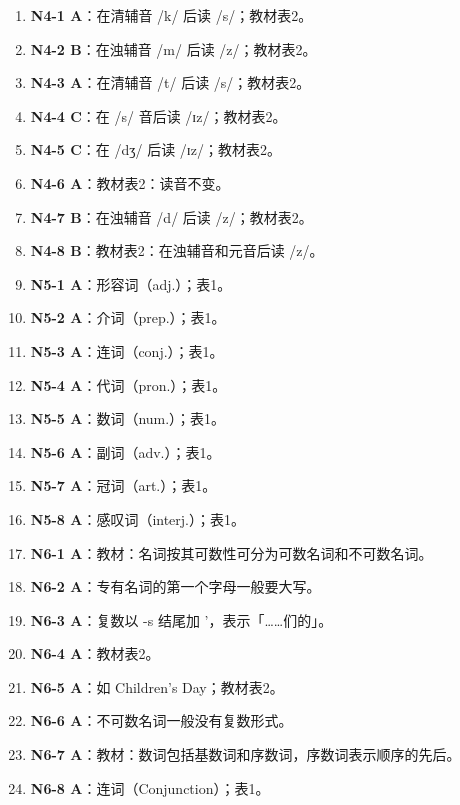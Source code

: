 \documentclass[11pt,a4paper]{ctexart}
\begin{document}
\begin{enumerate}[leftmargin=1.6em,itemsep=2pt]
\item \textbf{N4-1 A}：在清辅音 /k/ 后读 /s/；教材表2。
\item \textbf{N4-2 B}：在浊辅音 /m/ 后读 /z/；教材表2。
\item \textbf{N4-3 A}：在清辅音 /t/ 后读 /s/；教材表2。
\item \textbf{N4-4 C}：在 /s/ 音后读 /ɪz/；教材表2。
\item \textbf{N4-5 C}：在 /dʒ/ 后读 /ɪz/；教材表2。
\item \textbf{N4-6 A}：教材表2：读音不变。
\item \textbf{N4-7 B}：在浊辅音 /d/ 后读 /z/；教材表2。
\item \textbf{N4-8 B}：教材表2：在浊辅音和元音后读 /z/。
\item \textbf{N5-1 A}：形容词（adj.）；表1。
\item \textbf{N5-2 A}：介词（prep.）；表1。
\item \textbf{N5-3 A}：连词（conj.）；表1。
\item \textbf{N5-4 A}：代词（pron.）；表1。
\item \textbf{N5-5 A}：数词（num.）；表1。
\item \textbf{N5-6 A}：副词（adv.）；表1。
\item \textbf{N5-7 A}：冠词（art.）；表1。
\item \textbf{N5-8 A}：感叹词（interj.）；表1。
\item \textbf{N6-1 A}：教材：名词按其可数性可分为可数名词和不可数名词。
\item \textbf{N6-2 A}：专有名词的第一个字母一般要大写。
\item \textbf{N6-3 A}：复数以 -s 结尾加 ’，表示「……们的」。
\item \textbf{N6-4 A}：教材表2。
\item \textbf{N6-5 A}：如 Children’s Day；教材表2。
\item \textbf{N6-6 A}：不可数名词一般没有复数形式。
\item \textbf{N6-7 A}：教材：数词包括基数词和序数词，序数词表示顺序的先后。
\item \textbf{N6-8 A}：连词（Conjunction）；表1。
\end{enumerate}
\end{document}
